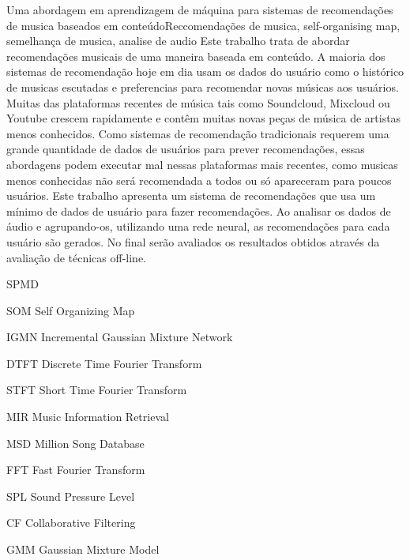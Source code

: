 \documentclass[cic,tc,english]{iiufrgs}
\begin{document}
\begin{englishabstract}{Uma abordagem em aprendizagem de máquina para sistemas de recomendações de musica baseados em conteúdo}{Reccomendações de musica, self-organising map, semelhança de musica, analise de audio}
	Este trabalho trata de abordar recomendações musicais de uma maneira baseada em conteúdo. A maioria dos sistemas de recomendação hoje em dia usam os dados do usuário como o histórico de musicas escutadas e preferencias para recomendar novas músicas aos usuários. Muitas das plataformas recentes de música tais como Soundcloud, Mixcloud ou Youtube crescem rapidamente e contêm muitas novas peças de música de artistas menos conhecidos. Como sistemas de recomendação tradicionais requerem uma grande quantidade de dados de usuários para prever recomendações, essas abordagens podem executar mal nessas plataformas mais recentes, como musicas menos conhecidas não será recomendada a todos ou só apareceram para poucos usuários. Este trabalho apresenta um sistema de recomendações que usa um mínimo de dados de usuário para fazer recomendações. Ao analisar os dados de áudio e agrupando-os, utilizando uma rede neural, as recomendações para cada usuário são gerados. No final serão avaliados os resultados obtidos através da avaliação de técnicas off-line.
\end{englishabstract}


\listoffigures

\listoftables

\begin{listofabbrv}{SPMD}
    \item[SOM] Self Organizing Map
    \item[IGMN] Incremental Gaussian Mixture Network
    \item[DTFT] Discrete Time Fourier Transform
    \item[STFT] Short Time Fourier Transform
    \item[MIR] Music Information Retrieval
    \item[MSD] Million Song Database
    \item[FFT] Fast Fourier Transform
    \item[SPL] Sound Pressure Level
    \item[CF] Collaborative Filtering
    \item[GMM] Gaussian Mixture Model
\end{listofabbrv}
\end{document}
